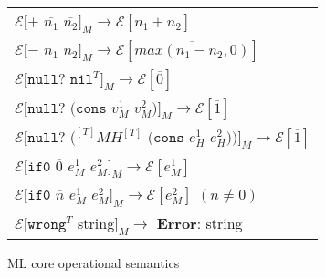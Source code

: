 \begin{figure}[p]
\begin{tabular}{l}
\vspace{5pt}

$\mathscr{E}[+$ $\overline{n_{1}}$ $\overline{n_{2}}]_{M}\rightarrow\mathscr{E}[\overline{n_{1}+n_{2}}]$ \\

\vspace{5pt}

$\mathscr{E}[-$ $\overline{n_{1}}$ $\overline{n_{2}}]_{M}\rightarrow\mathscr{E}[\overline{max(n_{1}-n_{2},0)}]$ \\

\vspace{5pt}

$\mathscr{E}[\mathtt{null?}$ $\mathtt{nil}^{T}]_{M}\rightarrow\mathscr{E}[\overline{0}]$ \\

\vspace{5pt}

$\mathscr{E}[\mathtt{null?}$ $(\mathtt{cons}$ $v_{M}^{1}$ $v_{M}^{2})]_{M}\rightarrow\mathscr{E}[\overline{1}]$ \\

\vspace{5pt}

$\mathscr{E}[\mathtt{null?}$ $(^{[T]}MH^{[T]}$ $(\mathtt{cons}$ $e_{H}^{1}$ $e_{H}^{2}))]_{M}\rightarrow\mathscr{E}[\overline{1}]$ \\

\vspace{5pt}

$\mathscr{E}[\mathtt{if0}$ $\overline{0}$ $e_{M}^{1}$ $e_{M}^{2}]_{M}\rightarrow\mathscr{E}[e_{M}^{1}]$ \\

\vspace{5pt}

$\mathscr{E}[\mathtt{if0}$ $\overline{n}$ $e_{M}^{1}$ $e_{M}^{2}]_{M}\rightarrow\mathscr{E}[e_{M}^{2}]$ $(n\neq0)$ \\

\vspace{5pt}

$\mathscr{E}[\mathtt{wrong}^{T}$ string$]_{M}\rightarrow$ \textbf{Error}: string 
\end{tabular}
\caption{ML core operational semantics}
\label{cmos}
\end{figure}